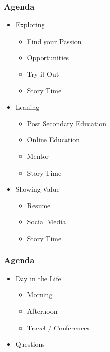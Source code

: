 \documentclass[aspectratio=169]{beamer}
\begin{document}
\begin{frame}
  \frametitle{Agenda}
  \begin{itemize}
    \item{Exploring}
      \begin{itemize}
        \item{Find your Passion}
        \item{Opportunities}
        \item{Try it Out}
        \item{Story Time}
      \end{itemize}
    \item{Leaning}
      \begin{itemize}
      \item{Post Secondary Education}
      \item{Online Education}
      \item{Mentor}
      \item{Story Time}
      \end{itemize}
    \item{Showing Value}
      \begin{itemize}
        \item{Resume}
        \item{Social Media}
        \item{Story Time}
      \end{itemize}
  \end{itemize}
\end{frame}

\begin{frame}
  \frametitle{Agenda}
  \begin{itemize}
  \item{Day in the Life}
    \begin{itemize}
    \item{Morning}
    \item{Afternoon}
    \item{Travel / Conferences}
    \end{itemize}
  \item{Questions}
  \end{itemize}
\end{frame}
\end{document}
